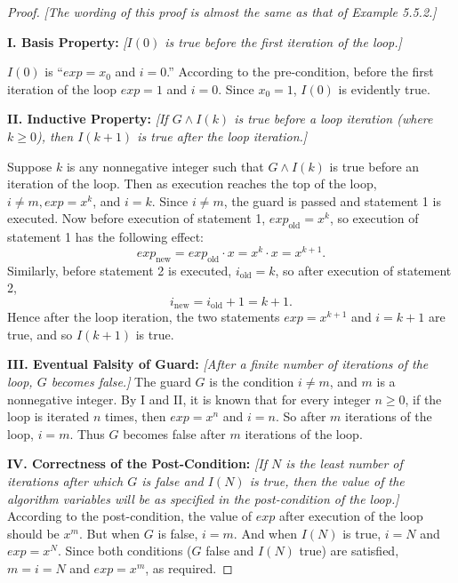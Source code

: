 \documentclass[14pt]{extarticle}
\begin{document}
\begin{proof}
    {\it [The wording of this proof is almost the same as
            that of Example 5.5.2.]}

    {\bf I. Basis Property:} {\it [$I(0)$ is true before the first iteration of the loop.]}

    $I(0)$ is “$exp = x_0$ and $i = 0$.” According to the pre-condition, before the first iteration of the loop
    $exp = 1$ and $i = 0$. Since $x_0 = 1$, $I(0)$ is evidently true.

        {\bf II. Inductive Property:} {\it [If $G \wedge I(k)$ is true before a loop iteration (where $k \geq 0$), then
                $I(k + 1)$ is true after the loop iteration.]}

    Suppose $k$ is any nonnegative integer such that $G \wedge I(k)$ is true before an iteration of the loop. Then as
    execution reaches the top of the loop, $i \neq m, exp = x^k$, and $i = k$. Since $i \neq m$, the guard is passed
    and statement 1 is executed. Now before execution of statement 1, $exp_{\text{old}} = x^k$, so execution of
    statement 1 has the following effect:
    \[
        exp_{\text{new}} = exp_{\text{old}} \cdot x = x^k \cdot x = x^{k+1}.
    \]
    Similarly, before statement 2 is executed, $i_{\text{old}} = k$, so after execution of statement 2,
    \[
        i_{\text{new}} = i_{\text{old}} + 1 = k + 1.
    \]
    Hence after the loop iteration, the two statements $exp = x^{k+1}$ and $i = k + 1$ are true, and so $I(k + 1)$ is true.

        {\bf III. Eventual Falsity of Guard:} {\it [After a finite number of iterations of the loop, $G$ becomes false.]} The
    guard $G$ is the condition $i \neq m$, and $m$ is a nonnegative integer. By I and II, it is known that for
    every integer $n \geq 0$, if the loop is iterated $n$ times, then $exp = x^n$ and $i = n$. So after $m$
    iterations of the loop, $i = m$. Thus $G$ becomes false after $m$ iterations of the loop.

        {\bf IV. Correctness of the Post-Condition:} {\it [If $N$ is the least number of iterations after which $G$ is false
                and $I(N)$ is true, then the value of the algorithm variables will be as specified in the post-condition of the
                loop.]} According to the post-condition, the value of $exp$ after execution of the loop should be $x^m$. But when $G$
    is false, $i = m$. And when $I(N)$ is true, $i = N$ and $exp = x^N$. Since both conditions ($G$ false and $I(N)$
    true) are satisfied, $m = i = N$ and $exp = x^m$, as required.
\end{proof}
\end{document}
